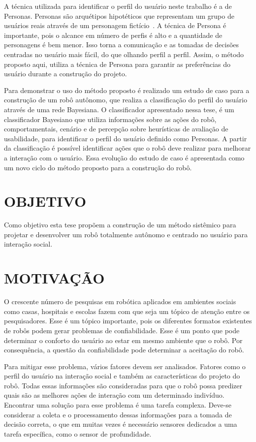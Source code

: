 A técnica utilizada para identificar o perfil do usuário neste trabalho é a de Personas. Personas são arquétipos hipotéticos que representam um grupo de usuários reais através de um personagem fictício~\cite{aquino:2005, masiero:2011}. A técnica de Persona é importante, pois o alcance em número de perfis é alto e a quantidade de personagens é bem menor. Isso torna a comunicação e as tomadas de decisões centradas no usuário mais fácil, do que olhando perfil a perfil. Assim, o método proposto aqui, utiliza a técnica de Persona para garantir as preferências do usuário durante a construção do projeto. 

Para demonstrar o uso do método proposto é realizado um estudo de caso para a construção de um robô autônomo, que realiza a classificação do perfil do usuário através de uma rede Bayesiana. O classificador apresentado nessa tese, é um classificador Bayesiano que utiliza informações sobre as ações do robô, comportamentais, cenário e de percepção sobre heurísticas de avaliação de usabilidade, para identificar o perfil do usuário definido como Personas. A partir da classificação é possível identificar ações que o robô deve realizar para melhorar a interação com o usuário. Essa evolução do estudo de caso é apresentada como um novo ciclo do método proposto para a construção do robô.

\section{OBJETIVO} %
Como objetivo esta tese propõem a construção de um método sistêmico para projetar e desenvolver um robô totalmente autônomo e centrado no usuário para interação social.

\section{MOTIVAÇÃO}
O crescente número de pesquisas em robótica aplicados em ambientes sociais como casas, hospitais e escolas fazem com que seja um tópico de atenção entre os pesquisadores. Esse é um tópico importante, pois os diferentes formatos existentes de robôs podem gerar problemas de confiabilidade. Esse é um ponto que pode determinar o conforto do usuário ao estar em mesmo ambiente que o robô. Por consequência, a questão da confiabilidade pode determinar a aceitação do robô.

Para mitigar esse problema, vários fatores devem ser analisados. Fatores como o perfil do usuário na interação social e também as características do projeto do robô. Todas essas informações são consideradas para que o robô possa predizer quais são as melhores ações de interação com um determinado indivíduo. Encontrar uma solução  para esse problema é uma tarefa complexa. Deve-se considerar a coleta e o processamento dessas informações para a tomada de decisão correta, o que em muitas vezes é necessário sensores dedicados a uma tarefa específica, como o sensor de profundidade.

